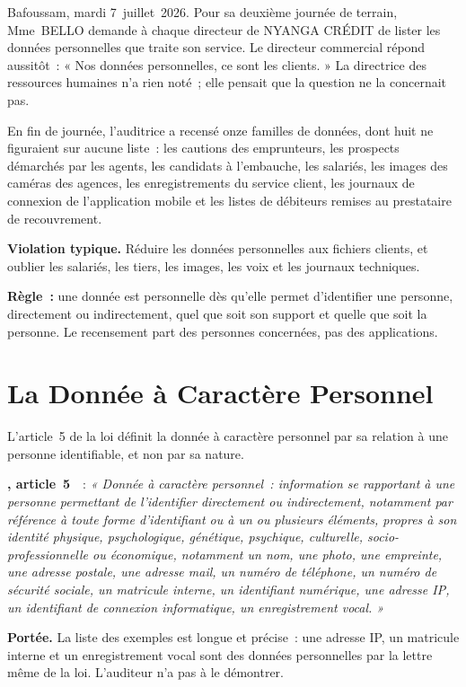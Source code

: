 Bafoussam, mardi 7~juillet~2026. Pour sa deuxième journée de terrain,
Mme~BELLO demande à chaque directeur de NYANGA CRÉDIT de lister les données
personnelles que traite son service. Le directeur commercial répond
aussitôt~: « Nos données personnelles, ce sont les clients. » La directrice
des ressources humaines n'a rien noté~; elle pensait que la question ne la
concernait pas.

En fin de journée, l'auditrice a recensé onze familles de données, dont
huit ne figuraient sur aucune liste~: les cautions des emprunteurs, les
prospects démarchés par les agents, les candidats à l'embauche, les
salariés, les images des caméras des agences, les enregistrements du
service client, les journaux de connexion de l'application mobile et les
listes de débiteurs remises au prestataire de recouvrement.

\begin{boxalert}
\textbf{Violation typique.} Réduire les données personnelles aux fichiers
clients, et oublier les salariés, les tiers, les images, les voix et les
journaux techniques.

\smallskip
\textbf{Règle~:} une donnée est personnelle dès qu'elle permet d'identifier
une personne, directement ou indirectement, quel que soit son support et
quelle que soit la personne. Le recensement part des personnes concernées,
pas des applications.
\end{boxalert}

\section{La Donnée à Caractère Personnel}
\label{sec:c01-donnee}

L'article~5 de la loi définit la donnée à caractère personnel par sa
relation à une personne identifiable, et non par sa nature.

\begin{boxjuris}
\textbf{, article~5}~\cite{loi2024017}~:
\textit{« Donnée à caractère personnel~: information se rapportant à une
personne permettant de l'identifier directement ou indirectement, notamment
par référence à toute forme d'identifiant ou à un ou plusieurs éléments,
propres à son identité physique, psychologique, génétique, psychique,
culturelle, socio-professionnelle ou économique, notamment un nom, une
photo, une empreinte, une adresse postale, une adresse mail, un numéro de
téléphone, un numéro de sécurité sociale, un matricule interne, un
identifiant numérique, une adresse IP, un identifiant de connexion
informatique, un enregistrement vocal. »}

\smallskip
\textbf{Portée.} La liste des exemples est longue et précise~: une adresse
IP, un matricule interne et un enregistrement vocal sont des données
personnelles par la lettre même de la loi. L'auditeur n'a pas à le
démontrer.
\end{boxjuris}

